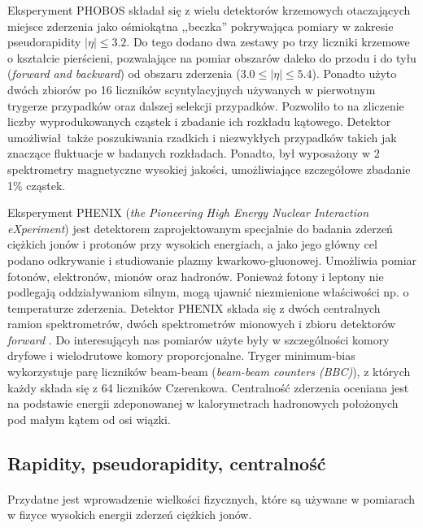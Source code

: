 \documentclass[a4paper,12pt]{article}
\begin{document}
Eksperyment PHOBOS składał się z wielu detektorów krzemowych otaczających miejsce zderzenia jako ośmiokątna ,,beczka'' pokrywająca pomiary w zakresie pseudorapidity $|\eta| \le 3.2$. Do tego dodano dwa zestawy po trzy liczniki krzemowe o kształcie pierścieni, pozwalające na pomiar obszarów daleko do przodu i do tyłu (\textit{forward and backward}) od obszaru zderzenia ($3.0 \le |\eta| \le 5.4$). Ponadto użyto dwóch zbiorów po 16 liczników scyntylacyjnych używanych w pierwotnym trygerze przypadków oraz dalszej selekcji przypadków. \cite{Back:2004mr} Pozwoliło to na zliczenie liczby wyprodukowanych cząstek i zbadanie ich rozkładu kątowego. Detektor umożliwiał także poszukiwania rzadkich i niezwykłych przypadków takich jak znaczące fluktuacje w badanych rozkładach. Ponadto, był wyposażony w 2 spektrometry magnetyczne wysokiej jakości, umożliwiające szczegółowe zbadanie 1\% cząstek. 

Eksperyment PHENIX (\textit{the Pioneering High Energy Nuclear Interaction eXperiment}) jest detektorem zaprojektowanym specjalnie do badania zderzeń ciężkich jonów i protonów przy wysokich energiach, a jako jego główny cel podano odkrywanie i studiowanie plazmy kwarkowo-gluonowej. Umożliwia pomiar fotonów, elektronów, mionów oraz hadronów. Ponieważ fotony i leptony nie podlegają oddziaływaniom silnym, mogą ujawnić niezmienione właściwości np. o temperaturze zderzenia. Detektor PHENIX składa się z dwóch centralnych ramion spektrometrów, dwóch spektrometrów mionowych i zbioru detektorów \textit{forward} \cite{Adare:2015bua}. Do interesującyh nas pomiarów użyte były w szczególności komory dryfowe i wielodrutowe komory proporcjonalne. Tryger minimum-bias wykorzystuje parę liczników beam-beam (\textit{beam-beam counters (BBC)}), z których każdy składa się z 64 liczników Czerenkowa. Centralność zderzenia oceniana jest na podstawie energii zdeponowanej w kalorymetrach hadronowych położonych pod małym kątem od osi wiązki.

\subsection{Rapidity, pseudorapidity, centralność}
\paragraph{}
Przydatne jest wprowadzenie wielkości fizycznych, które są używane w pomiarach w fizyce wysokich energii zderzeń ciężkich jonów.
\end{document}
